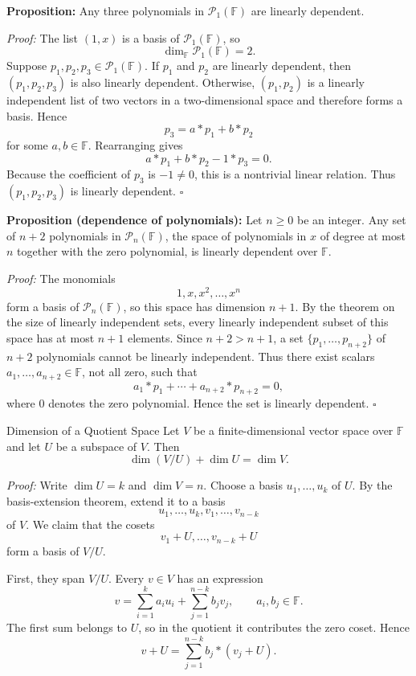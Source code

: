 \documentclass[a4paper,11pt,abstract=true]{scrartcl}
\theoremstyle{dotlessP}
\theoremstyle{dotlessS}
\theoremstyle{remark}
\theoremstyle{definition}
\begin{document}
\textbf{Proposition:} Any three polynomials in $\mathcal{P}_1(\mathbb{F})$ are
linearly dependent.

\textit{Proof:} The list $(1,x)$ is a basis of $\mathcal{P}_1(\mathbb{F})$, so
\[
\dim_{\mathbb{F}}\mathcal{P}_1(\mathbb{F})=2.
\]
Suppose $p_1,p_2,p_3\in\mathcal{P}_1(\mathbb{F})$. If $p_1$ and $p_2$ are linearly
dependent, then $(p_1,p_2,p_3)$ is also linearly dependent. Otherwise,
$(p_1,p_2)$ is a linearly independent list of two vectors in a
two-dimensional space and therefore forms a basis. Hence
\[
p_3=a*p_1+b*p_2
\]
for some $a,b\in \mathbb{F}$. Rearranging gives
\[
a*p_1+b*p_2-1*p_3=0.
\]
Because the coefficient of $p_3$ is $-1\neq0$, this is a nontrivial linear
relation. Thus $(p_1,p_2,p_3)$ is linearly dependent. \hfill$\square$

\textbf{Proposition (dependence of polynomials):} Let $n\geq0$ be an
integer. Any set of $n+2$ polynomials in $\mathcal{P}_n(\mathbb{F})$, the
space of polynomials in $x$ of degree at most $n$ together with the zero
polynomial, is linearly dependent over $\mathbb{F}$.

\textit{Proof:} The monomials
\[
1,x,x^2,\ldots,x^n
\]
form a basis of $\mathcal{P}_n(\mathbb{F})$, so this space has dimension
$n+1$. By the theorem on the size of linearly independent sets, every
linearly independent subset of this space has at most $n+1$ elements.
Since $n+2>n+1$, a set $\{p_1,\ldots,p_{n+2}\}$ of $n+2$ polynomials
cannot be linearly independent. Thus there exist scalars
$a_1,\ldots,a_{n+2}\in\mathbb{F}$, not all zero, such that
\[
a_1*p_1+\cdots+a_{n+2}*p_{n+2}=0,
\]
where $0$ denotes the zero polynomial. Hence the set is linearly dependent.
\hfill$\square$

\begin{mainbox}{Dimension of a Quotient Space}
Let $V$ be a
finite-dimensional vector space over $\mathbb{F}$ and let $U$ be a subspace
of $V$. Then
\[
\dim(V/U)+\dim U=\dim V.
\]
\end{mainbox}

\textit{Proof:} Write $\dim U=k$ and $\dim V=n$. Choose a basis
$u_1,\ldots,u_k$ of $U$. By the basis-extension theorem,
extend it to a basis
\[
u_1,\ldots,u_k,v_1,\ldots,v_{n-k}
\]
of $V$. We claim that the cosets
\[
v_1+U,\ldots,v_{n-k}+U
\]
form a basis of $V/U$.

First, they span $V/U$. Every $v\in V$ has an expression
\[
v=\sum_{i=1}^{k}a_i u_i+\sum_{j=1}^{n-k}b_j v_j,
\qquad a_i,b_j\in\mathbb{F}.
\]
The first sum belongs to $U$, so in the quotient it contributes the zero
coset. Hence
\[
v+U=\sum_{j=1}^{n-k}b_j*(v_j+U).
\]
\end{document}
